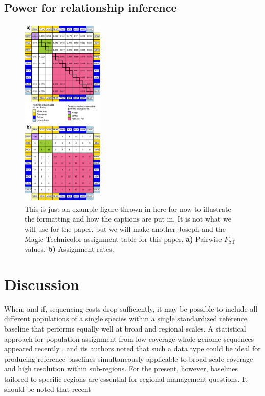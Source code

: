 \subsection*{Power for relationship inference}

\begin{figure}
\newcommand{\examplecap}{\footnotesize This is just an example figure thrown
in here for now to illustrate the formatting and how the captions are put in. It is not what
we will use for the paper, but we will make another Joseph and the Magic Technicolor
assignment table for this paper.  {\bf a)} Pairwise $F_\mathrm{ST}$ values.
{\bf b)} Assignment rates.}
\begin{center}
\includegraphics[width=0.35\textwidth]{images/assign_and_fst_table.pdf}
\end{center}
\caption[\examplecap]{\examplecap}
\label{fig:example}
\end{figure}


\section*{Discussion}

When, and if, sequencing costs drop sufficiently, it may  be possible to include
all different populations of a single species within a single standardized reference baseline
that performs equally well at broad and regional scales. A statistical approach for population
assignment from low coverage whole genome sequences appeared recently
\citep{desaixINPRESSpopulation}, and its authors noted that such a data type could
be ideal for producing reference baselines simultaneously applicable to broad scale
coverage and high resolution within sub-regions.   For the present, however,
baselines tailored to specific regions are essential for regional management questions.
It should be noted that recent 

